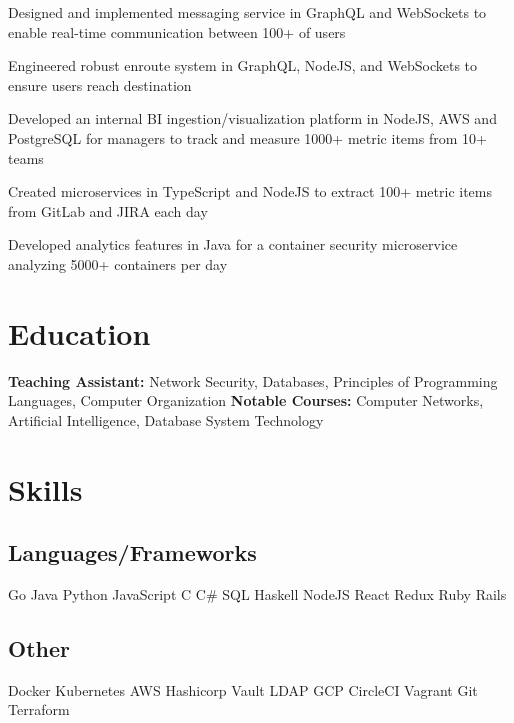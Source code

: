 \documentclass[]{deedy-resume}
\begin{document}
\begin{tightemize}
\item Designed and implemented messaging service in GraphQL and WebSockets to enable real-time communication between 100+ of users
\item Engineered robust enroute system in GraphQL, NodeJS, and WebSockets to ensure users reach destination
\end{tightemize}
\sectionsep

\begin{tightemize}
\item Developed an internal BI ingestion/visualization platform in NodeJS, AWS and PostgreSQL for managers to track and measure 1000+ metric items from 10+ teams
\item Created microservices in TypeScript and NodeJS to extract 100+ metric items from GitLab and JIRA each day
\item Developed analytics features in Java for a container security microservice analyzing 5000+ containers per day
\end{tightemize}
\sectionsep

\section{Education}

\textbf{Teaching Assistant:} Network Security, Databases, Principles of Programming Languages, Computer Organization
\newline
\textbf{Notable Courses:} Computer Networks, Artificial Intelligence, Database System Technology
\sectionsep

\section{Skills}
\begin{minipage}[t]{1.0\textwidth}
\subsection{Languages/Frameworks}
Go \textbullet{} Java \textbullet{} Python \textbullet{} JavaScript \textbullet{} C \textbullet{}
C\# \textbullet{} SQL \textbullet{} Haskell \textbullet{}
NodeJS \textbullet{} React \textbullet{} Redux \textbullet{} Ruby \textbullet{} Rails
\sectionsep
\subsection{Other}
Docker \textbullet{} Kubernetes \textbullet{} AWS \textbullet{} Hashicorp Vault \textbullet{} LDAP \textbullet{} GCP
\textbullet{} CircleCI \textbullet{} Vagrant \textbullet{} Git \textbullet{} Terraform
\sectionsep
\end{minipage}
\hfill
\end{document}
